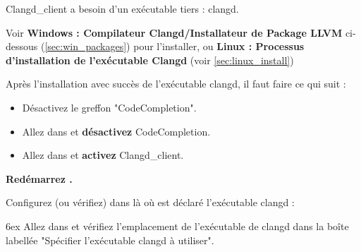 Clangd\_client a besoin d'un exécutable tiers : clangd.

Voir \textbf{Windows : Compilateur Clangd/Installateur de Package LLVM} ci-dessous (\ref{sec:win_packages}) pour l'installer, ou \textbf{Linux : Processus d'installation de l'exécutable Clangd} (voir \ref{sec:linux_install})

Après l'installation avec succès de l'exécutable clangd, il faut faire ce qui suit :

\begin{itemize}[noitemsep]
\item Désactivez le greffon "CodeCompletion".
\item Allez dans  et \textbf{désactivez} CodeCompletion.
\item Allez dans  et \textbf{activez} Clangd\_client.
\end{itemize}
\textbf{Redémarrez \codeblocks.}

Configurez (ou vérifiez) dans \codeblocks là où est déclaré l'exécutable clangd :\par
\begingroup
\leftskip 6ex
Allez dans  et vérifiez l'emplacement de l'exécutable de clangd dans la boîte labellée "Spécifier l'exécutable clangd à utiliser".
\par
\endgroup

